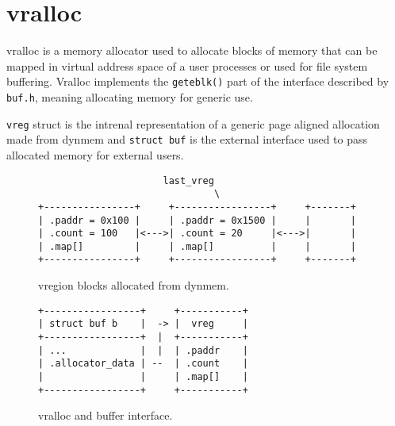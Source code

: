 \chapter{vralloc}

\acf{vralloc} is a memory allocator used to allocate blocks of memory
that can be mapped in virtual address space of a user processes or used for
file system buffering. Vralloc implements the \verb+geteblk()+ part of the interface
described by \verb+buf.h+, meaning allocating memory for generic use.

\verb+vreg+ struct is the intrenal representation of a generic page aligned
allocation made from dynmem and \verb+struct buf+ is the external interface
used to pass allocated memory for external users.

\begin{figure}
\begin{verbatim}
                      last_vreg
                               \
+----------------+     +-----------------+     +-------+
| .paddr = 0x100 |     | .paddr = 0x1500 |     |       |
| .count = 100   |<--->| .count = 20     |<--->|       |
| .map[]         |     | .map[]          |     |       |
+----------------+     +-----------------+     +-------+
\end{verbatim}
\caption{vregion blocks allocated from dynmem.}
\label{figure:vralloc_blocks}
\end{figure}

\begin{figure}
\begin{verbatim}
+-----------------+     +-----------+
| struct buf b    |  -> |  vreg     |
+-----------------+  |  +-----------+
| ...             |  |  | .paddr    |
| .allocator_data | --  | .count    |
|                 |     | .map[]    |
+-----------------+     +-----------+
\end{verbatim}
\caption{vralloc and buffer interface.}
\label{figure:vrregbufapi}
\end{figure}
